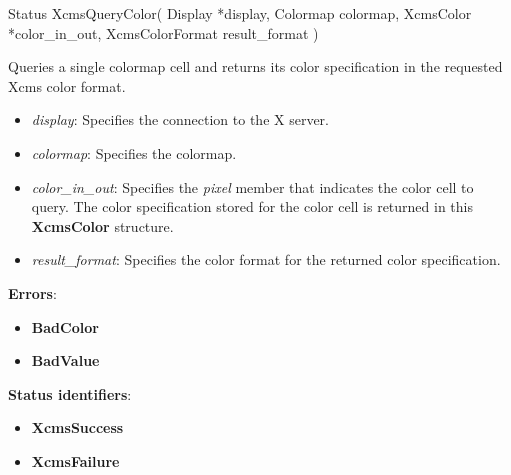 \documentclass{report}
\begin{document}
\begin{itemize}
            \begin{cppcode}
                Status XcmsQueryColor(
                    Display *display,
                    Colormap colormap,
                    XcmsColor *color_in_out,
                    XcmsColorFormat result_format
                )
            \end{cppcode}
            \bigbreak \noindent
            Queries a single colormap cell and returns its color specification in the requested Xcms color format.
            \begin{itemize}
                \item \textit{display}: Specifies the connection to the X server.
                \item \textit{colormap}: Specifies the colormap.
                \item \textit{color\_in\_out}: Specifies the \textit{pixel} member that indicates the color cell to query. The color specification stored for the color cell is returned in this \textbf{XcmsColor} structure.
                \item \textit{result\_format}: Specifies the color format for the returned color specification.
            \end{itemize}
            \bigbreak \noindent
            \textbf{Errors}:
            \begin{itemize}
                \item \textbf{BadColor}
                \item \textbf{BadValue}
            \end{itemize}
            \bigbreak \noindent
            \textbf{Status identifiers}:
            \begin{itemize}
                \item \textbf{XcmsSuccess}
                \item \textbf{XcmsFailure}
            \end{itemize}


\end{itemize}
\end{document}
